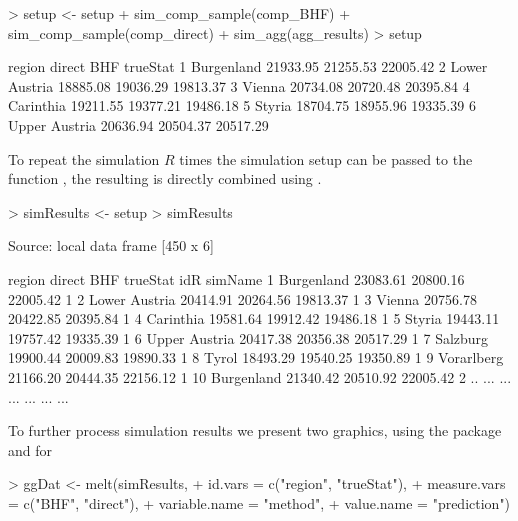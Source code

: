 \documentclass[article]{ajs}
\begin{document}
\begin{Schunk}
\begin{Sinput}
> setup <- setup %
+   sim_comp_sample(comp_BHF) %
+   sim_comp_sample(comp_direct) %
+   sim_agg(agg_results)
> setup
\end{Sinput}
\begin{Soutput}
         region   direct      BHF trueStat
1    Burgenland 21933.95 21255.53 22005.42
2 Lower Austria 18885.08 19036.29 19813.37
3        Vienna 20734.08 20720.48 20395.84
4     Carinthia 19211.55 19377.21 19486.18
5        Styria 18704.75 18955.96 19335.39
6 Upper Austria 20636.94 20504.37 20517.29
\end{Soutput}
\end{Schunk}

To repeat the simulation $R$ times the simulation setup can be passed to the function , the resulting  is directly combined using .

\begin{Schunk}
\begin{Sinput}
> simResults <- setup %
> simResults
\end{Sinput}
\begin{Soutput}
Source: local data frame [450 x 6]

          region   direct      BHF trueStat idR simName
1     Burgenland 23083.61 20800.16 22005.42   1        
2  Lower Austria 20414.91 20264.56 19813.37   1        
3         Vienna 20756.78 20422.85 20395.84   1        
4      Carinthia 19581.64 19912.42 19486.18   1        
5         Styria 19443.11 19757.42 19335.39   1        
6  Upper Austria 20417.38 20356.38 20517.29   1        
7       Salzburg 19900.44 20009.83 19890.33   1        
8          Tyrol 18493.29 19540.25 19350.89   1        
9     Vorarlberg 21166.20 20444.35 22156.12   1        
10    Burgenland 21340.42 20510.92 22005.42   2        
..           ...      ...      ...      ... ...     ...
\end{Soutput}
\end{Schunk}

To further process simulation results we present two graphics, using the package  \citep{wickham09} and  \citep{wickham07} for 
\begin{Schunk}
\begin{Sinput}
> ggDat <- melt(simResults,
+               id.vars = c("region", "trueStat"), 
+               measure.vars = c("BHF", "direct"), 
+               variable.name = "method",
+               value.name = "prediction")
\end{Sinput}
\end{Schunk}
\end{document}
